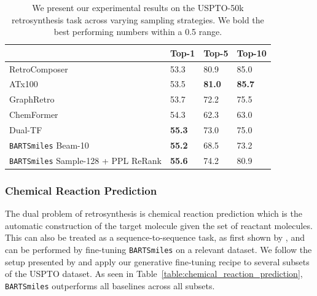 \documentclass{article} %
\newcommand{\MODEL}{\texttt{BARTSmiles}}
\begin{document}
\begin{table}
\centering%
\begin{tabular}{@{}llll@{}}
\toprule
& Top-1 & Top-5 & Top-10 \\ \midrule
RetroComposer \citep{retrocomposer} & 53.3  & 80.9  & 85.0  \\
ATx100 \citep{augmented_transformer} & 53.5 & \textbf{81.0} & \textbf{85.7} \\
GraphRetro \citep{graph_retro} & 53.7 & 72.2 & 75.5 \\
ChemFormer \citep{chemformer} & 54.3 & 62.3 & 63.0 \\
Dual-TF \citep{retrosynthesis_energy} & \textbf{55.3} & 73.0 & 75.0 \\ \midrule
\MODEL{} Beam-10 & \textbf{55.2} & 68.5 & 73.2 \\ 
\MODEL{} Sample-128 + PPL ReRank & \textbf{55.6} & 74.2 & 80.9 \\\midrule
\end{tabular}
\caption{We present our experimental results on the USPTO-50k retrosynthesis task across varying sampling strategies. We bold the best performing numbers within a 0.5 range.}\label{table:retrosynthesis}
\end{table}

\subsubsection{Chemical Reaction Prediction}
The dual problem of retrosynthesis is chemical reaction prediction which is the automatic construction of the target molecule given the set of reactant molecules. This can also be treated as a sequence-to-sequence task, as first shown by \citet{reaction-prediction-seq2seq}, and can be performed by fine-tuning \MODEL{} on a relevant dataset. We follow the setup presented by \citet{molecular-transformer} and apply our generative fine-tuning recipe to several subsets of the USPTO dataset. As seen in Table~\ref{table:chemical_reaction_prediction}, \MODEL{} outperforms all baselines across all subsets.
\end{document}

